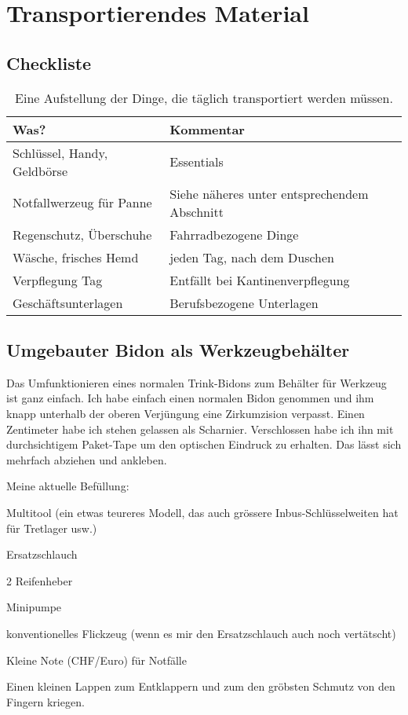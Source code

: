 \section{Transportierendes Material}

\subsection{Checkliste}

\begin{table}
  \centering
  \begin{tabular}{ll}
    \toprule
        Was?    & Kommentar \\
    \midrule
        Schlüssel, Handy, Geldbörse     & Essentials \\
        Notfallwerzeug für Panne        & Siehe näheres unter entsprechendem Abschnitt \\
        Regenschutz, Überschuhe         & Fahrradbezogene Dinge \\
        Wäsche, frisches Hemd           & jeden Tag, nach dem Duschen \\ 
        Verpflegung Tag                 & Entfällt bei Kantinenverpflegung \\
        Geschäftsunterlagen             & Berufsbezogene Unterlagen \\
    \bottomrule
  \end{tabular}
  \caption{Eine Aufstellung der Dinge, die täglich transportiert werden müssen.}
  \label{tab:transportmaterial}
\end{table}

\subsection{Umgebauter Bidon als Werkzeugbehälter}

Das Umfunktionieren eines normalen Trink-Bidons zum Behälter für Werkzeug ist ganz einfach.
Ich habe einfach einen normalen Bidon genommen und ihm knapp unterhalb der
oberen Verjüngung eine Zirkumzision verpasst.
Einen Zentimeter habe ich stehen gelassen als Scharnier.
Verschlossen habe ich ihn mit durchsichtigem Paket-Tape um den optischen Eindruck zu erhalten.
Das lässt sich mehrfach abziehen und ankleben.

Meine aktuelle Befüllung:
\begin{itemize*}
   \item Multitool (ein etwas teureres Modell, das auch grössere Inbus-Schlüsselweiten hat für Tretlager usw.)
   \item Ersatzschlauch
   \item 2 Reifenheber
   \item Minipumpe
   \item konventionelles Flickzeug (wenn es mir den Ersatzschlauch auch noch vertätscht)
   \item Kleine Note (CHF/Euro) für Notfälle
   \item Einen kleinen Lappen zum Entklappern und zum den gröbsten Schmutz von den Fingern kriegen.
\end{itemize*}
